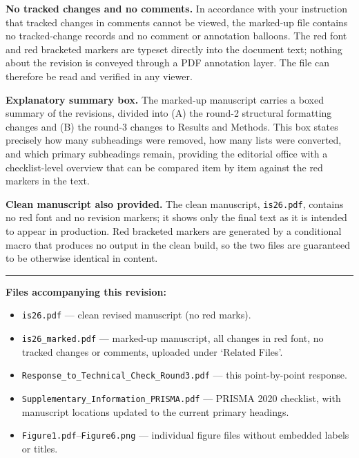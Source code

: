 \documentclass[11pt,a4paper]{article}
\begin{document}
\vspace{0.5em}
\noindent\textbf{No tracked changes and no comments.} In accordance with your instruction that tracked changes in comments cannot be viewed, the marked-up file contains no tracked-change records and no comment or annotation balloons. The red font and red bracketed markers are typeset directly into the document text; nothing about the revision is conveyed through a PDF annotation layer. The file can therefore be read and verified in any viewer.

\vspace{0.5em}
\noindent\textbf{Explanatory summary box.} The marked-up manuscript carries a boxed summary of the revisions, divided into (A) the round-2 structural formatting changes and (B) the round-3 changes to Results and Methods. This box states precisely how many subheadings were removed, how many lists were converted, and which primary subheadings remain, providing the editorial office with a checklist-level overview that can be compared item by item against the red markers in the text.

\vspace{0.5em}
\noindent\textbf{Clean manuscript also provided.} The clean manuscript, \texttt{is26.pdf}, contains no red font and no revision markers; it shows only the final text as it is intended to appear in production. Red bracketed markers are generated by a conditional macro that produces no output in the clean build, so the two files are guaranteed to be otherwise identical in content.

\vspace{1.5em}
\hrule
\vspace{1.5em}

\noindent\textbf{Files accompanying this revision:}

\begin{itemize}
  \item \texttt{is26.pdf} --- clean revised manuscript (no red marks).
  \item \texttt{is26\_marked.pdf} --- marked-up manuscript, all changes in red font, no tracked changes or comments, uploaded under `Related Files'.
  \item \texttt{Response\_to\_Technical\_Check\_Round3.pdf} --- this point-by-point response.
  \item \texttt{Supplementary\_Information\_PRISMA.pdf} --- PRISMA 2020 checklist, with manuscript locations updated to the current primary headings.
  \item \texttt{Figure1.pdf}--\texttt{Figure6.png} --- individual figure files without embedded labels or titles.
\end{itemize}
\end{document}
